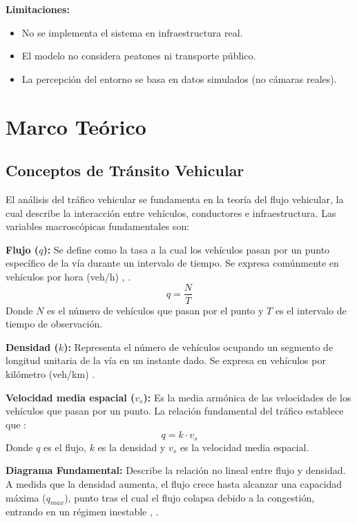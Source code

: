 \documentclass[12pt, a4paper]{report}
\begin{document}
\textbf{Limitaciones:}
\begin{itemize}
    \item No se implementa el sistema en infraestructura real.
    \item El modelo no considera peatones ni transporte público.
    \item La percepción del entorno se basa en datos simulados (no cámaras reales).
\end{itemize}

\chapter{Marco Teórico}

\section{Conceptos de Tránsito Vehicular}
El análisis del tráfico vehicular se fundamenta en la teoría del flujo vehicular, la cual describe la interacción entre vehículos, conductores e infraestructura. Las variables macroscópicas fundamentales son:

\textbf{Flujo ($q$):} Se define como la tasa a la cual los vehículos pasan por un punto específico de la vía durante un intervalo de tiempo. Se expresa comúnmente en vehículos por hora (veh/h) \cite{1}, \cite{5}.
\begin{equation}
    q = \frac{N}{T}
\end{equation}
Donde $N$ es el número de vehículos que pasan por el punto y $T$ es el intervalo de tiempo de observación.

\textbf{Densidad ($k$):} Representa el número de vehículos ocupando un segmento de longitud unitaria de la vía en un instante dado. Se expresa en vehículos por kilómetro (veh/km) \cite{5}.

\textbf{Velocidad media espacial ($v_s$):} Es la media armónica de las velocidades de los vehículos que pasan por un punto. La relación fundamental del tráfico establece que \cite{1}:
\begin{equation}
    q = k \cdot v_s
\end{equation}
Donde $q$ es el flujo, $k$ es la densidad y $v_s$ es la velocidad media espacial.

\textbf{Diagrama Fundamental:} Describe la relación no lineal entre flujo y densidad. A medida que la densidad aumenta, el flujo crece hasta alcanzar una capacidad máxima ($q_{max}$), punto tras el cual el flujo colapsa debido a la congestión, entrando en un régimen inestable \cite{5}, \cite{6}.
\end{document}
